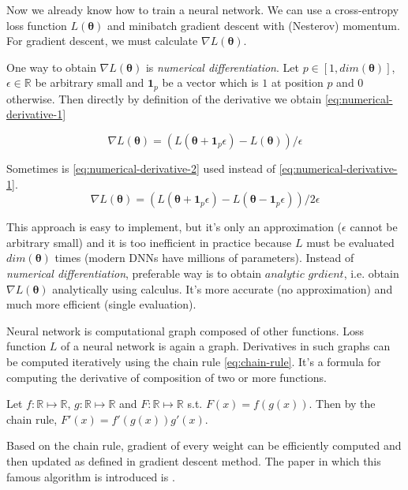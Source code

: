 Now we already know how to train a neural network. We can use a cross-entropy loss function $L (\pmb \theta)$ and minibatch gradient descent with (Nesterov) momentum. For gradient descent, we must calculate $\nabla L (\pmb \theta)$.

One way to obtain $\nabla L (\pmb \theta)$ is \textit{numerical differentiation}. 
Let $p \in [1, dim(\pmb \theta)]$, $\epsilon \in \mathbb{R}$ be arbitrary small and $\pmb 1_p$ be a vector which is $1$ at position $p$ and $0$ otherwise. Then directly by definition of the derivative we obtain \ref{eq:numerical-derivative-1}

\begin{equation}\label{eq:numerical-derivative-1}
\nabla L (\pmb \theta) = (L(\pmb \theta + \pmb 1_p \epsilon) - L (\pmb \theta)) / \epsilon
\end{equation}

Sometimes is \ref{eq:numerical-derivative-2} used instead of \ref{eq:numerical-derivative-1}.
\begin{equation}\label{eq:numerical-derivative-2}
\nabla L (\pmb \theta) = (L(\pmb \theta + \pmb 1_p \epsilon) - L (\pmb \theta - \pmb 1_p \epsilon)) / 2 \epsilon
\end{equation}

This approach is easy to implement, but it's only an approximation ($\epsilon$ cannot be arbitrary small) and it is too inefficient in practice because $L$ must be evaluated $dim(\pmb\theta)$ times (modern DNNs have millions of parameters). Instead of \textit{numerical differentiation}, preferable way is to obtain $\textit{analytic grdient}$, i.e. obtain $\nabla L (\pmb \theta)$ analytically using calculus. It's more accurate (no approximation) and much more efficient (single evaluation).


Neural network is computational graph composed of other functions. Loss function $L$ of a neural network is again a graph. Derivatives in such graphs can be computed iteratively using the chain rule \ref{eq:chain-rule}. It's a formula for computing the derivative of composition of two or more functions. 

Let $f: \mathbb{R} \mapsto \mathbb{R}$, $g: \mathbb{R} \mapsto \mathbb{R}$ and $F: \mathbb{R} \mapsto \mathbb{R}$ s.t. $F(x) = f(g(x))$. Then by the chain rule, $F'(x) = f'(g(x))g'(x)$.

Based on the chain rule, gradient of every weight can be efficiently computed and then updated as defined in gradient descent method. The paper in which this famous algorithm is introduced is \cite{Rumelhart:1986:LIR:104279.104293}.
